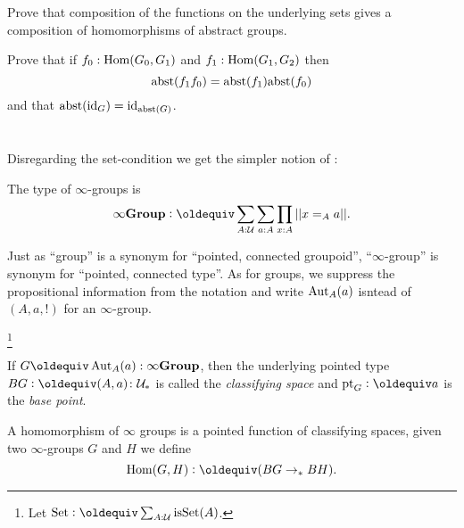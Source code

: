 \begin{xca}
Prove that composition of the functions on the underlying sets gives a composition of homomorphisms of abstract groups.

  Prove that if $f_0:\mathrm{Hom}(G_0,G_1)$ and $f_1:\mathrm{Hom}(G_1,G_2)$ then 
$$\mathrm{abst}(f_1f_0)=\mathrm{abst}(f_1)\mathrm{abst}(f_0)$$ and that $\mathrm{abst}(\mathord{\mathrm{id}}_G)=\mathord{\mathrm{id}}_{\mathrm{abst}(G)}$.
\end{xca}



\section{\texorpdfstring{\inftygps}{∞-groups}}
\label{sec:inftygps}

Disregarding the set-condition we get the simpler notion of \inftygps:
\begin{definition}The type of $\infty$-groups is
  $$\typeinftygp\defequi \sum_{A:\UU}\sum_{a:A}\prod_{x:A}||x=_Aa||.$$
\end{definition}

\begin{remark}\label{rem:pointedtypes}
  Just as ``group'' is a synonym for ``pointed, connected groupoid'', ``$\infty$-group'' is synonym for ``pointed, connected type''.  As for groups, we suppress the propositional information from the notation and write $\mathrm{Aut}_A(a)$ isntead of $(A,a,!)$ for an $\infty$-group.
\end{remark}


\footnote{Let $\typeset\defequi \sum_{A:\UU}\isset(A)$.}
\begin{definition}\label{def:classifyingspace}
  If $G\oldequiv\Aut_A(a):\typeinftygp$, then the underlying pointed type $BG\defequi (A,a)\colon\pttype$ is called the  \emph{classifying space} and $\pt_G\defequi a$ is the \emph{base point}.  
\end{definition}
\begin{definition}
  A homomorphism of $\infty$ groups is a pointed function of classifying spaces, \ie
  given two $\infty$-groups $G$ and $H$ we define
$$\Hom(G,H)\defequi(BG\to_*BH).$$
\end{definition}





